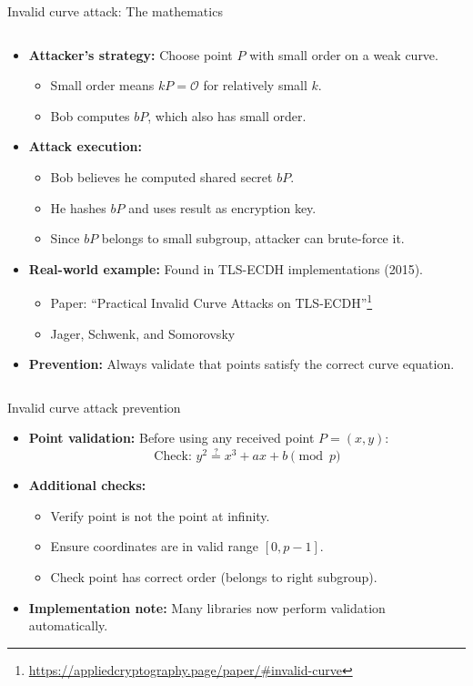 \documentclass[aspectratio=169, lualatex, handout]{beamer}
\begin{document}
\begin{frame}{Invalid curve attack: The mathematics}
	\begin{columns}[c]
		\begin{column}{1\textwidth}
			\begin{itemize}
				\item \textbf{Attacker's strategy:} Choose point $P$ with small order on a weak curve.
				      \begin{itemize}
					      \item Small order means $kP = \mathcal{O}$ for relatively small $k$.
					      \item Bob computes $bP$, which also has small order.
				      \end{itemize}
				\item \textbf{Attack execution:}
				      \begin{itemize}
					      \item Bob believes he computed shared secret $bP$.
					      \item He hashes $bP$ and uses result as encryption key.
					      \item Since $bP$ belongs to small subgroup, attacker can brute-force it.
				      \end{itemize}
				\item \textbf{Real-world example:} Found in TLS-ECDH implementations (2015).
				      \begin{itemize}
					      \item Paper: ``Practical Invalid Curve Attacks on TLS-ECDH''\footnote{\url{https://appliedcryptography.page/paper/\#invalid-curve}}
					      \item Jager, Schwenk, and Somorovsky
				      \end{itemize}
				\item \textbf{Prevention:} Always validate that points satisfy the correct curve equation.
			\end{itemize}
		\end{column}
	\end{columns}
\end{frame}

\begin{frame}{Invalid curve attack prevention}
	\begin{itemize}
		\item \textbf{Point validation:} Before using any received point $P = (x, y)$:
		      $$\text{Check: } y^2 \stackrel{?}{=} x^3 + ax + b \pmod{p}$$
		\item \textbf{Additional checks:}
		      \begin{itemize}
			      \item Verify point is not the point at infinity.
			      \item Ensure coordinates are in valid range $[0, p-1]$.
			      \item Check point has correct order (belongs to right subgroup).
		      \end{itemize}
		\item \textbf{Implementation note:} Many libraries now perform validation automatically.
	\end{itemize}
\end{frame}
\end{document}

